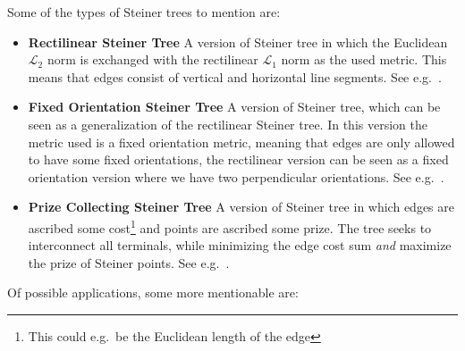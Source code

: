 Some of the types of Steiner trees to mention are:

\begin{itemize}
\item \textbf{Rectilinear Steiner Tree} \quad A version of Steiner tree in which
  the Euclidean $\mathcal{L}_2$ norm is exchanged with the rectilinear
  $\mathcal{L}_1$ norm as the used metric. This means that edges consist of
  vertical and horizontal line segments. See e.g.~\textcite[ch.~3]{brazil2015}.
\item \textbf{Fixed Orientation Steiner Tree} \quad A version of Steiner tree,
  which can be seen as a generalization of the rectilinear Steiner tree. In this
  version the metric used is a fixed orientation metric, meaning that edges are
  only allowed to have some fixed orientations, the rectilinear version can be
  seen as a fixed orientation version where we have two perpendicular
  orientations. See e.g.~\textcite[ch.~2]{brazil2015}.
\item \textbf{Prize Collecting Steiner Tree} \quad A version of Steiner tree in
  which edges are ascribed some cost\footnote{This could e.g.\ be the Euclidean
    length of the edge} and points are ascribed some prize. The tree seeks to
  interconnect all terminals, while minimizing the edge cost sum \textit{and}
  maximize the prize of Steiner points. See e.g.~\textcite{johnson2000}.
\end{itemize}

Of possible applications, some more mentionable are:

